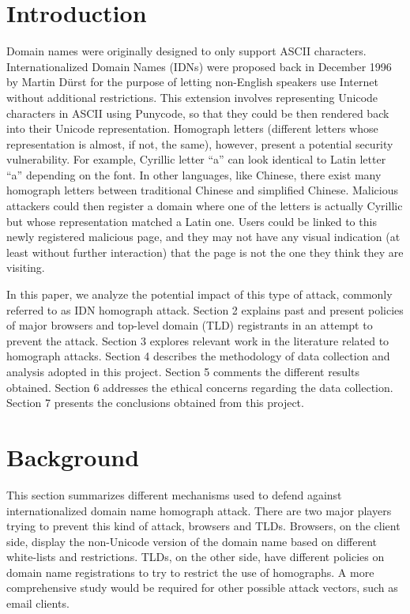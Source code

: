 \documentclass[letterpaper,twocolumn,10pt]{article}
\begin{document}
\section{Introduction}
Domain names were originally designed to only support ASCII characters.
Internationalized Domain Names (IDNs) were proposed back in December 1996 by Martin D\"{u}rst for the purpose of letting non-English speakers use Internet without additional restrictions.
This extension involves representing Unicode characters in ASCII using Punycode, so that they could be then rendered back into their Unicode representation.
Homograph letters (different letters whose representation is almost, if not, the same), however, present a potential security vulnerability.
For example, Cyrillic letter ``a'' can look identical to Latin letter ``a'' depending on the font.
In other languages, like Chinese, there exist many homograph letters between traditional Chinese and simplified Chinese.
Malicious attackers could then register a domain where one of the letters is actually Cyrillic but whose representation matched a Latin one.
Users could be linked to this newly registered malicious page, and they may not have any visual indication (at least without further interaction) that the page is not the one they think they are visiting.

In this paper, we analyze the potential impact of this type of attack, commonly referred to as IDN homograph attack.
Section 2 explains past and present policies of major browsers and top-level domain (TLD) registrants in an attempt to prevent the attack.
Section 3 explores relevant work in the literature related to homograph attacks.
Section 4 describes the methodology of data collection and analysis adopted in this project.
Section 5 comments the different results obtained.
Section 6 addresses the ethical concerns regarding the data collection.
Section 7 presents the conclusions obtained from this project.

\section{Background}
This section summarizes different mechanisms used to defend against internationalized domain name homograph attack.
There are two major players trying to prevent this kind of attack, browsers and TLDs.
Browsers, on the client side, display the non-Unicode version of the domain name based on different white-lists and restrictions.
TLDs, on the other side, have different policies on domain name registrations to try to restrict the use of homographs.
A more comprehensive study would be required for other possible attack vectors, such as email clients.
\end{document}
